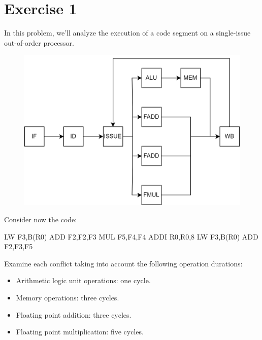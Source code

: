 \section{Exercise 1}

In this problem, we'll analyze the execution of a code segment on a single-issue out-of-order processor.
\begin{figure}[H]
    \centering
    \includegraphics[width=0.75\linewidth]{images/complex.png}
\end{figure} 
Consider now the code:
\begin{verbnobox}[\verbarg]
LW F3,B(R0)
ADD F2,F2,F3
MUL F5,F4,F4
ADDI R0,R0,8
LW F3,B(R0)
ADD F2,F3,F5
\end{verbnobox}
Examine each conflict taking into account the following operation durations:
\begin{itemize}
    \item Arithmetic logic unit operations: one cycle.
    \item Memory operations: three cycles.
    \item Floating point addition: three cycles.
    \item Floating point multiplication: five cycles.
\end{itemize}

